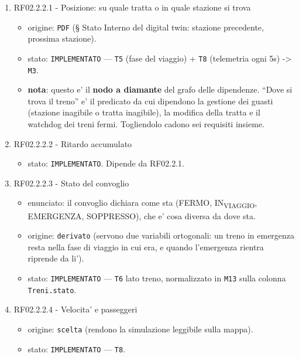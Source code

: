 \documentclass[11pt]{article}
\begin{document}
\begin{enumerate}
\item RF02.2.2.1 - Posizione: su quale tratta o in quale stazione si trova
\label{sec:orgadd29e5}
\begin{itemize}
\item origine: \texttt{PDF} (§ Stato Interno del digital twin: stazione precedente, prossima stazione).
\item stato: \texttt{IMPLEMENTATO} — \texttt{T5} (fase del viaggio) + \texttt{T8} (telemetria ogni 5s) -> \texttt{M3}.
\item \textbf{nota}: questo e' il \textbf{nodo a diamante} del grafo delle dipendenze. ``Dove si trova il treno'' e' il
predicato da cui dipendono la gestione dei guasti (stazione inagibile o tratta inagibile), la
modifica della tratta e il watchdog dei treni fermi. Togliendolo cadono sei requisiti insieme.
\end{itemize}
\item RF02.2.2.2 - Ritardo accumulato
\label{sec:org11aa48c}
\begin{itemize}
\item stato: \texttt{IMPLEMENTATO}. Dipende da RF02.2.1.
\end{itemize}
\item RF02.2.2.3 - Stato del convoglio
\label{sec:org549e9f7}
\begin{itemize}
\item enunciato: il convoglio dichiara come sta (FERMO, IN\textsubscript{VIAGGIO}, EMERGENZA, SOPPRESSO), che e' cosa
diversa da dove sta.
\item origine: \texttt{derivato} (servono due variabili ortogonali: un treno in emergenza resta nella fase di
viaggio in cui era, e quando l'emergenza rientra riprende da li').
\item stato: \texttt{IMPLEMENTATO} — \texttt{T6} lato treno, normalizzato in \texttt{M13} sulla colonna \texttt{Treni.stato}.
\end{itemize}
\item RF02.2.2.4 - Velocita' e passeggeri
\label{sec:org63d2802}
\begin{itemize}
\item origine: \texttt{scelta} (rendono la simulazione leggibile sulla mappa).
\item stato: \texttt{IMPLEMENTATO} — \texttt{T8}.
\end{itemize}
\end{enumerate}
\end{document}
